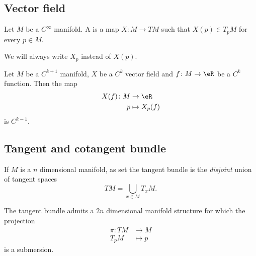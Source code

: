 \subsection{Vector field}

\begin{definition}
    Let \( M\) be a \(  C^{\infty}\) manifold. A  is a map \( X\colon M\to TM\) such that \( X(p)\in T_pM\) for every \( p\in M\).

    We will always write \( X_p\) instead of \( X(p)\).
\end{definition}

\begin{proposition}
    Let \( M\) be a \( C^{k+1}\) manifold, \( X\) be a \( C^k\) vector field and \( f\colon M \to \eR\) be a \( C^k\) function. Then the map
    \begin{equation}
        \begin{aligned}
            X(f)\colon M&\to \eR \\
            p&\mapsto X_p(f) 
        \end{aligned}
    \end{equation}
    is \( C^{k-1}\).
\end{proposition}


\subsection{Tangent and cotangent bundle}

If $M$ is a $n$ dimensional manifold, as set the tangent bundle is the \emph{disjoint} union of tangent spaces
\[
  TM=\bigcup_{x\in M}T_xM.
\]

\begin{theorem}
	The tangent bundle admits a $2n$ dimensional manifold structure for which the projection
	\begin{equation}
		\begin{aligned}
			\pi \colon TM &\to M\\
			T_pM&\mapsto p
		\end{aligned}
	\end{equation}
	is a submersion.
\end{theorem}

